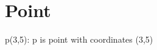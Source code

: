 \hypertarget{Point-example}{}\section{Point}
p(3,5)\+: p is point with coordinates (3,5)


\begin{DoxyCodeInclude}
\end{DoxyCodeInclude}
 